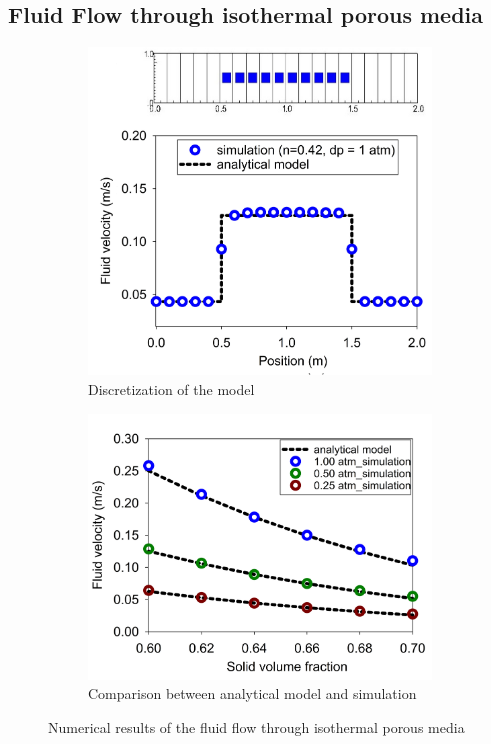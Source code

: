 \documentclass[preprint,12pt]{elsarticle}
\begin{document}
\subsection{\textsf{Fluid Flow through isothermal porous media}}
%
%
\begin{figure}[h]
\center
\begin{subfigure}[c]{0.5\linewidth}
\includegraphics[width=\linewidth]{porousflow1.jpg}
\caption{Discretization of the model}
\label{fig:3c}
\end {subfigure}\hfill    
\begin{subfigure}[d]{0.5\linewidth}
\includegraphics[width=\linewidth]{porousflow.jpg}
\caption{Comparison between analytical model and simulation}
\label{fig:3d}
\end {subfigure}
\caption{Numerical results of the fluid flow through isothermal porous media}
\label{fig:porousflow}
\end {figure}
\end{document}

